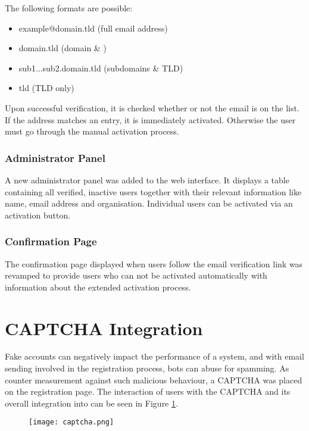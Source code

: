 The following formats are possible:

\begin{itemize}
	\item example@domain.tld (full email address)
	\item domain.tld (domain \& )
	\item sub1...sub2.domain.tld (subdomains \& TLD)
	\item tld (TLD only)
\end{itemize}

Upon successful verification, it is checked whether or not the email is on the list. If the address matches an entry, it is immediately activated. Otherwise the user must go through the manual activation process.


\subsubsection{Administrator Panel}
A new administrator panel was added to the web interface. It displays a table containing all verified, inactive users together with their relevant information like name, email address and organisation. Individual users can be activated via an activation button.

\subsubsection{Confirmation Page}
The confirmation page displayed when users follow the email verification link was revamped to provide users who can not be activated automatically with information about the extended activation process.

\section{CAPTCHA Integration}
\label{impl_capt}

Fake accounts can negatively impact the performance of a system, and with email sending involved in the registration process, bots can abuse \lcs for spamming. As counter measurement against such malicious behaviour, a CAPTCHA was placed on the registration page. The interaction of users with the CAPTCHA and its overall integration into \lcs can be seen in Figure \ref{capt:dia}.
  
\begin{figure}
	\centering
	\texttt{[image: captcha.png]}
	\label{capt:dia}
\end{figure}


